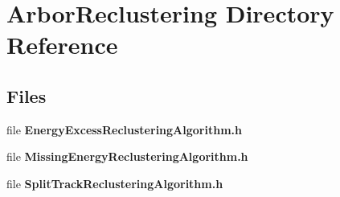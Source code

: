 \section{Arbor\+Reclustering Directory Reference}
\label{dir_fef0546db8367ba7a9684944f4ac26eb}
\subsection*{Files}
\begin{DoxyCompactItemize}
\item 
file {\bf Energy\+Excess\+Reclustering\+Algorithm.\+h}
\item 
file {\bf Missing\+Energy\+Reclustering\+Algorithm.\+h}
\item 
file {\bf Split\+Track\+Reclustering\+Algorithm.\+h}
\end{DoxyCompactItemize}

